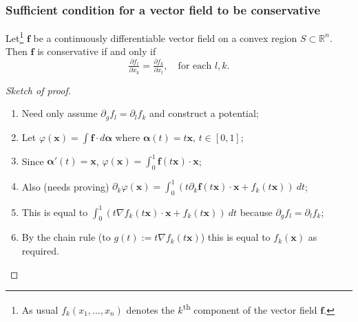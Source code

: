 \documentclass[aspectratio=169,handout]{beamer}
\newcommand{\bR}{\mathbb{R}} %
\newcommand{\ff}{\mathbf{f}}
\newcommand{\xx}{\mathbf{x}}
\newcommand{\aalpha}{\boldsymbol{\alpha}}
\begin{document}
\begin{frame}
    \frametitle{Sufficient condition for a vector field to be conservative}


    \begin{theorem}
        Let\footnote{As usual  \(  f_k(x_1,\ldots,x_n)\) denotes the \(k\)\textsuperscript{th} component of the vector field \(\ff\).} \(\ff\) be a continuously differentiable vector field on a convex region \(S\subset \bR^n\). 
        Then \(\ff\) is conservative if and only if
        \[
            \tfrac{\partial f_l}{\partial x_k} = \tfrac{\partial f_k}{\partial x_l},
            \quad \text{for each \(l,k\)}.
        \]
    \end{theorem}

    \vspace{-1em}

    \begin{proof}[Sketch of proof]
        \begin{enumerate}
            \item Need only assume \(\partial_g f_l = \partial_l f_k\) and construct a potential;
            \item Let \(\varphi(\xx) = \int \ff \cdot d\aalpha\) where \(\aalpha(t) = t\xx\), \(t\in[0,1]\);
            \item Since \(\aalpha'(t) = \xx\), \(\varphi(\xx) = \int_0^1 \ff(t\xx)\cdot \xx\);
            \item Also (needs proving) \(\partial_k  \varphi(\xx) = \int_{0}^{1} \left( t \partial_k \ff(t\xx) \cdot \xx + f_k(t\xx) \right) \ dt\);
            \item This is equal to \(\int_{0}^{1} \left( t \nabla f_k(t\xx) \cdot \xx + f_k(t\xx) \right) \ dt\) because  \(\partial_g f_l = \partial_l f_k\);
            \item By the chain rule (to \(g(t):= t \nabla f_k(t\xx) \)) this is equal to \(f_k(\xx)\) as required.
        \end{enumerate}
        
    \end{proof}

\end{frame}
\end{document}

